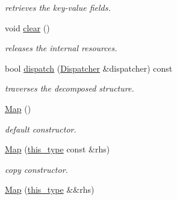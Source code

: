 \begin{DoxyCompactItemize}
\begin{DoxyCompactList}\small\item\em retrieves the key-\/value fields. \end{DoxyCompactList}\item 
\hypertarget{classhryky_1_1reduction_1_1_map_a8f14455a90219d197b5b809f72da5189}{void \hyperlink{classhryky_1_1reduction_1_1_map_a8f14455a90219d197b5b809f72da5189}{clear} ()}\label{classhryky_1_1reduction_1_1_map_a8f14455a90219d197b5b809f72da5189}

\begin{DoxyCompactList}\small\item\em releases the internal resources. \end{DoxyCompactList}\item 
bool \hyperlink{classhryky_1_1reduction_1_1_base_a71b31d4d0ed915254e2cb1ef217f28c4}{dispatch} (\hyperlink{classhryky_1_1reduction_1_1_dispatcher}{Dispatcher} \&dispatcher) const 
\begin{DoxyCompactList}\small\item\em traverses the decomposed structure. \end{DoxyCompactList}\item 
\hypertarget{classhryky_1_1reduction_1_1_map_adc75e1c0d88c11f18e90a8da278c9c4c}{\hyperlink{classhryky_1_1reduction_1_1_map_adc75e1c0d88c11f18e90a8da278c9c4c}{Map} ()}\label{classhryky_1_1reduction_1_1_map_adc75e1c0d88c11f18e90a8da278c9c4c}

\begin{DoxyCompactList}\small\item\em default constructor. \end{DoxyCompactList}\item 
\hypertarget{classhryky_1_1reduction_1_1_map_a114a27d04d4f319c7bbb083e0f2f4d1f}{\hyperlink{classhryky_1_1reduction_1_1_map_a114a27d04d4f319c7bbb083e0f2f4d1f}{Map} (\hyperlink{classhryky_1_1reduction_1_1_base_af02a7dee6042080b7380afd2f9500a42}{this\-\_\-type} const \&rhs)}\label{classhryky_1_1reduction_1_1_map_a114a27d04d4f319c7bbb083e0f2f4d1f}

\begin{DoxyCompactList}\small\item\em copy constructor. \end{DoxyCompactList}\item 
\hypertarget{classhryky_1_1reduction_1_1_map_a786db4e271d5fd835eaee1499715e1b1}{\hyperlink{classhryky_1_1reduction_1_1_map_a786db4e271d5fd835eaee1499715e1b1}{Map} (\hyperlink{classhryky_1_1reduction_1_1_base_af02a7dee6042080b7380afd2f9500a42}{this\-\_\-type} \&\&rhs)}\label{classhryky_1_1reduction_1_1_map_a786db4e271d5fd835eaee1499715e1b1}


\end{DoxyCompactItemize}
